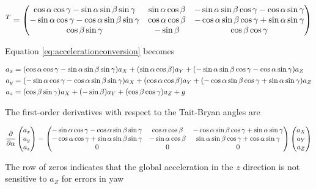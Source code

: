 \documentclass[10pt]{article}
\begin{document}
\begin{equation}
  [R(\alpha, \beta, \gamma)]^T
  =
\begin{pmatrix}
  \ca\cg-\sa\sb\sg & \sa\cb & -\sa\sb\cg - \ca\sg \\ 
   -\sa\cg - \ca\sb\sg & \ca\cb & -\ca\sb\cg + \sa\sg \\
   \cb\sg&  -\sb& \cb\cg
  \end{pmatrix}
\end{equation}

Equation \ref{eq:accelerationconversion} becomes 

\begin{align}
  a_x &=   (\cos{\alpha}\cos\gamma-\sin\alpha\sin\beta\sin\gamma) a_X + (\sin\alpha\cos\beta) a_Y + (-\sin\alpha\sin\beta\cos\gamma - \cos{\alpha}\sin\gamma) a_Z \\ 
  a_y &= (-\sin\alpha\cos\gamma - \cos{\alpha}\sin\beta\sin\gamma) a_X + (\cos{\alpha}\cos\beta)a_Y + (-\cos{\alpha}\sin\beta\cos\gamma + \sin\alpha\sin\gamma) a_Z \\
  a_z &= (\cos\beta\sin\gamma)a_X +  (-\sin\beta)a_Y + (\cos\beta\cos\gamma) a_Z + g
\end{align}

The first-order derivatives with respect to the Tait-Bryan angles are




\begin{equation}
  \frac{\partial}{\partial \alpha}
  \begin{pmatrix}
    a_x \\ a_y \\ a_z
  \end{pmatrix}
  = 
\begin{pmatrix}
  -\sin\alpha \cos\gamma -\cos{\alpha}\sin\beta\sin\gamma & \cos{\alpha} \cos\beta & -\cos{\alpha}\sin\beta\cos\gamma+\sin\alpha\sin\gamma \\
 -\cos{\alpha}\cos\gamma+\sin\alpha\sin\beta\sin\gamma & -\sin\alpha\cos\beta &  \sin\alpha\sin\beta\cos\gamma+\cos{\alpha}\sin\gamma \\
0 & 0 & 0
\end{pmatrix}
\begin{pmatrix}
a_X \\ a_Y \\ a_Z
\end{pmatrix}
\end{equation}

The row of zeros indicates that the global acceleration in the $z$ direction is not sensitive to $a_Z$ for errors in yaw 
\end{document}
